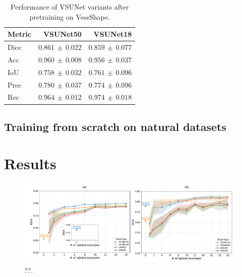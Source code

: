 \documentclass[%
reprint,
nofootinbib,
 amsmath,amssymb,
aps,
superscriptaddress,
showkeys,
longbibliography
]{revtex4-1}
\begin{document}
\begin{table}[t]
    \caption{Performance of VSUNet variants after pretraining on VessShape.}
    \label{tab:vessshape_results}
    \centering
    \begingroup
    \small
    \setlength{\tabcolsep}{6pt}
    \renewcommand{\arraystretch}{1.15}
    \begin{tabular}{l r r}
        \hline
        	\textbf{Metric} & \textbf{VSUNet50} & \textbf{VSUNet18} \\
        \hline
        Dice & $0.861 \,\pm\, 0.022$ & $0.859 \,\pm\, 0.077$ \\
        Acc & $0.960 \,\pm\, 0.008$ & $0.956 \,\pm\, 0.037$ \\
        IoU & $0.758 \,\pm\, 0.032$ & $0.761 \,\pm\, 0.096$ \\
        Prec & $0.780 \,\pm\, 0.037$ & $0.774 \,\pm\, 0.096$ \\
        Rec & $0.964 \,\pm\, 0.012$ & $0.974 \,\pm\, 0.018$ \\
        \hline
    \end{tabular}
    \endgroup
\end{table}

\subsection{Training from scratch on natural datasets}

\section{Results}
\label{s:results}

\begin{figure}[tbp]
    \centering
    \includegraphics[width=\textwidth]{figures/results/results_charts.pdf}
    \caption{??.}
    \label{f:results_charts}
\end{figure}
\end{document}
